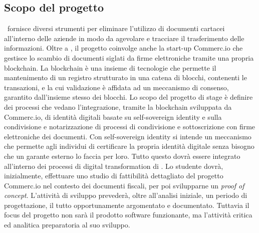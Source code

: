 
\subsection{Scopo del progetto}
	\ragioneSocAzienda\ fornisce diversi strumenti per eliminare l'utilizzo di documenti cartacei all’interno delle aziende in modo da agevolare e tracciare il trasferimento delle informazioni. Oltre a \ragioneSocAzienda, il progetto coinvolge anche la start-up Commerc.io che gestisce lo scambio di documenti siglati da firme elettroniche tramite una propria blockchain.
	\newline
	La blockchain è una insieme di tecnologie che permette il mantenimento di un registro strutturato in una catena di blocchi, contenenti le transazioni, e la cui validazione è affidata ad un meccanismo di consenso, garantito dall'insieme stesso dei blocchi.
	\newline
	Lo scopo del progetto di stage è definire dei processi che vedano l'integrazione, tramite la blockchain sviluppata da Commerc.io, di identità digitali basate su self-sovereign identity e sulla condivisione e notarizzazione di processi di condivisione e sottoscrizione con firme elettroniche dei documenti.
	\newline
	Con self-sovereign identity si intende un meccanismo che permette agli individui di certificare la propria identità digitale senza bisogno che un garante esterno lo faccia per loro.
	\newline
	Tutto questo dovrà essere integrato all'interno dei processi di digital transformation di \ragioneSocAzienda.
	\newline
	Lo studente dovrà, inizialmente, effettuare uno studio di fattibilità dettagliato del progetto Commerc.io nel contesto dei documenti fiscali, per poi svilupparne un \textit{proof of concept}. L'attività di sviluppo prevederà, oltre all'analisi iniziale, un periodo di progettazione, il tutto opportunamente argomentato e documentato.
	\newline
	Tuttavia il focus del progetto non sarà il prodotto software funzionante, ma l'attività critica ed analitica preparatoria al suo sviluppo.
